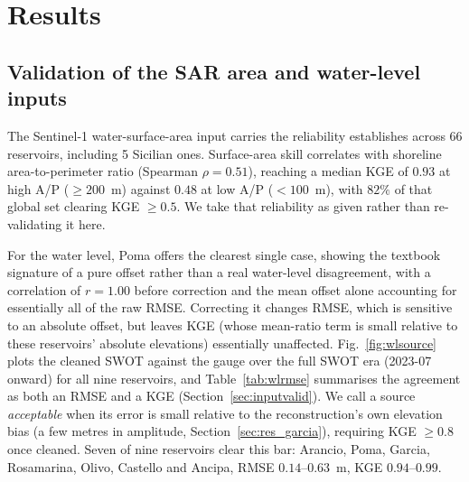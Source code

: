 \section{Results}
\label{sec:results}

\subsection{Validation of the SAR area and water-level inputs}
\label{sec:res_inputvalid}
The Sentinel-1 water-surface-area input carries the reliability \citet{PaperOne} establishes
across 66 reservoirs, including 5 Sicilian ones. Surface-area skill correlates with shoreline
area-to-perimeter ratio (Spearman $\rho=0.51$), reaching a median KGE of $0.93$ at high A/P
($\geq200$~m) against $0.48$ at low A/P ($<100$~m), with $82\%$ of that global set clearing
KGE $\geq0.5$. We take that reliability as given rather than re-validating it here.

\label{sec:res_ladder}
For the water level, Poma offers the clearest single case, showing the textbook signature of
a pure offset rather than a real water-level disagreement, with a correlation of $r=1.00$
before correction and the mean offset alone accounting for essentially all of the raw RMSE.
Correcting it changes RMSE, which is sensitive to an absolute offset, but leaves KGE (whose
mean-ratio term is small relative to these reservoirs' absolute elevations) essentially
unaffected. Fig.~\ref{fig:wlsource} plots the cleaned SWOT against the gauge over the full
SWOT era (2023-07 onward) for all nine reservoirs, and Table~\ref{tab:wlrmse} summarises the
agreement as both an RMSE and a KGE (Section~\ref{sec:inputvalid}). We call a source
\emph{acceptable} when its error is small relative to the reconstruction's own elevation bias
(a few metres in amplitude, Section~\ref{sec:res_garcia}), requiring KGE $\geq0.8$ once cleaned.
Seven of nine reservoirs clear this bar: Arancio, Poma, Garcia, Rosamarina, Olivo, Castello
and Ancipa, RMSE $0.14$--$0.63$~m, KGE $0.94$--$0.99$.

